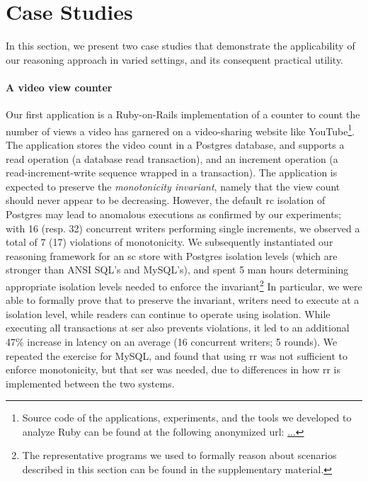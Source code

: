 \section{Case Studies}
\label{sec:case-studies}

In this section, we present two case studies that demonstrate the
applicability of our reasoning approach in varied settings, and its
consequent practical utility.

\paragraph{A video view counter} Our first application is a
Ruby-on-Rails implementation of a counter to count the number of views
a video has garnered on a video-sharing website like
YouTube\footnote{Source code of the applications, experiments, and the
  tools we developed to analyze Ruby can be found at the following
  anonymized url: \url{...}}. The application stores the video count
in a Postgres database, and supports a read operation (a database read
transaction), and an increment operation (a read-increment-write
sequence wrapped in a transaction). The application is expected to
preserve the \emph{monotonicity invariant}, namely that the view count
should never appear to be decreasing. However, the default {\sc rc}
isolation of Postgres may lead to anomalous executions as confirmed by
our experiments; with 16 (resp.  32) concurrent writers performing
single increments, we observed a total of 7 (17) violations of
monotonicity. We subsequently instantiated our reasoning framework for
an {\sc sc} store with Postgres isolation levels (which are stronger
than ANSI SQL's and MySQL's), and spent 5 man hours determining
appropriate isolation levels needed to enforce the
invariant\footnote{The representative \txnimp programs we used to
  formally reason about scenarios described in this section can be
  found in the supplementary material.} In particular, we were able to
formally prove that to preserve the invariant, writers need to execute
at a  isolation level, while readers can continue
to operate using  isolation.  While executing all
transactions at {\sc ser} also prevents violations, it led to an
additional 47\% increase in latency on an average (16 concurrent
writers; 5 rounds). We repeated the exercise for MySQL, and found that
using {\sc rr} was not sufficient to enforce monotonicity, but that
{\sc ser} was needed, due to differences in how {\sc rr} is
implemented between the two systems.

